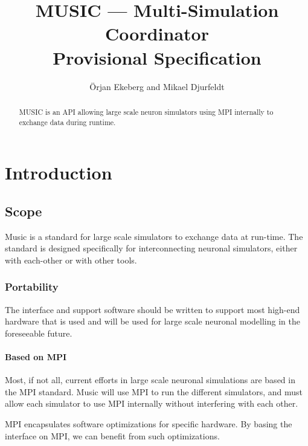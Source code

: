 \documentclass[a4paper]{report}
\begin{document}
\title{MUSIC --- Multi-Simulation Coordinator\\
  Provisional Specification}

\author{Örjan Ekeberg and Mikael Djurfeldt}

\maketitle

\begin{abstract}
  MUSIC is an API allowing large scale neuron simulators using MPI
  internally to exchange data during runtime.
\end{abstract}


\tableofcontents

\chapter{Introduction}

\section{Scope}

Music is a standard for large scale simulators to exchange data at
run-time.  The standard is designed specifically for interconnecting
neuronal simulators, either with each-other or with other tools.


\subsection{Portability}

The interface and support software should be written to support most
high-end hardware that is used and will be used for large scale
neuronal modelling in the foreseeable future.


\subsubsection{Based on MPI}

Most, if not all, current efforts in large scale neuronal simulations
are based in the MPI standard.  Music will use MPI to run the
different simulators, and must allow each simulator to use MPI
internally without interfering with each other.

MPI encapsulates software optimizations for specific hardware.  By
basing the interface on MPI, we can benefit from such optimizations.
\end{document}
